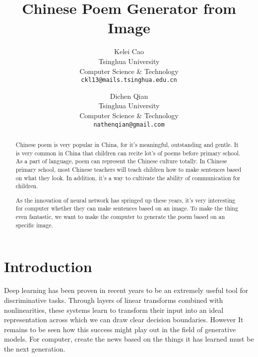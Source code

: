 \documentclass[10pt,twocolumn,letterpaper]{article}
\begin{document}
\title{ Chinese Poem Generator from Image}

\author{Kelei Cao\\
Tsinghua University \\
Computer Science \& Technology\\
{\tt\small ckl13@mails.tsinghua.edu.cn}
\and
Dichen Qian\\
Tsinghua University \\
Computer Science \& Technology\\
{\tt\small nathenqian@gmail.com}
}

\maketitle

\begin{abstract}
   	Chinese poem is very popular in China, for it's meaningful, outstanding and gentle. It is very common in China that children can recite lot's of poems before primary school. As a part of language, poem can represent the Chinese culture totally. 
	In Chinese primary school, most Chinese teachers will teach children how to make sentences based on what they look. In addition, it's a way to cultivate the ability of communication for children.

	As the innovation of neural network has springed up these years, it's very interesting for computer whether they can make sentences based on an image. To make the thing even fantastic, we want to make the computer to generate the poem based on an specific image.
	
\end{abstract}

\section{Introduction}
Deep learning has been proven in recent years to be an extremely useful tool for discriminative tasks. Through layers of linear transforms combined with nonlinearities, these systems learn to transform their input into an ideal representation across which we can draw clear decision boundaries. However It remains to be seen how this success might play out in the field of generative models. For computer, create the news based on the things it has learned must be the next generation.
\end{document}
